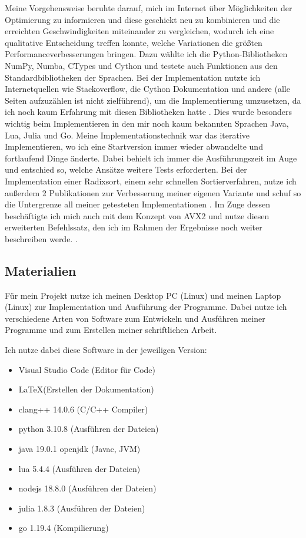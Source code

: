 \documentclass[11pt,a4paper]{article}
\begin{document}
Meine Vorgehensweise beruhte darauf, mich im Internet über Möglichkeiten der Optimierung zu informieren und diese geschickt neu zu kombinieren und die erreichten Geschwindigkeiten miteinander zu vergleichen, wodurch
ich eine qualitative Entscheidung treffen konnte, welche Variationen die größten Performanceverbesserungen bringen.
Dazu wählte ich die Python-Bibliotheken NumPy, Numba, CTypes und Cython und
testete auch Funktionen aus den Standardbibliotheken der Sprachen.
Bei der Implementation nutzte ich Internetquellen wie Stackoverflow, die Cython Dokumentation und andere 
(alle Seiten aufzuzählen ist nicht zielführend), um die Implementierung umzusetzen, 
da ich noch kaum Erfahrung mit diesen Bibliotheken hatte \cite{stackoverflow} \cite{cythondocs}.
Dies wurde besonders wichtig beim Implementieren in den mir noch kaum bekannten Sprachen Java, Lua, Julia und Go.
Meine Implementationstechnik war das iterative Implementieren, wo ich eine Startversion immer wieder abwandelte und
fortlaufend Dinge änderte. Dabei behielt ich immer die Ausführungszeit im Auge und entschied so, welche Ansätze
weitere Tests erforderten.
Bei der Implementation einer Radixsort, einem sehr schnellen Sortierverfahren, nutze ich außerdem 2 Publikationen 
zur Verbesserung meiner eigenen Variante und schuf so die Untergrenze all meiner getesteten Implementationen
\cite{terdiman} \cite{michael}.
Im Zuge dessen beschäftigte ich mich auch mit dem Konzept von AVX2 und nutze diesen erweiterten Befehlssatz, den
ich im Rahmen der Ergebnisse noch weiter beschreiben werde.
\cite{intelavxdocs} \cite{avxguide}.

\clearpage

\subsection{Materialien}
Für mein Projekt nutze ich meinen Desktop PC (Linux) und meinen Laptop (Linux) zur Implementation und Ausführung der Programme.
Dabei nutze ich verschiedene Arten von Software zum Entwickeln und Ausführen meiner Programme und zum Erstellen meiner
schriftlichen Arbeit. \newline

Ich nutze dabei diese Software in der jeweiligen Version:

\begin{itemize}
    \item Visual Studio Code (Editor für Code)
    \item \LaTeX (Erstellen der Dokumentation)
    \item clang++ 14.0.6 (C/C++ Compiler)
    \item python 3.10.8 (Ausführen der Dateien)
    \item java 19.0.1 openjdk (Javac, JVM)
    \item lua 5.4.4 (Ausführen der Dateien)
    \item nodejs 18.8.0 (Ausführen der Dateien)
    \item julia 1.8.3 (Ausführen der Dateien)
    \item go 1.19.4 (Kompilierung)
\end{itemize}
\end{document}
